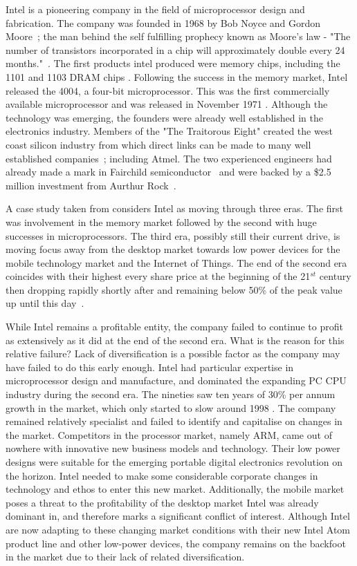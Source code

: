 {}

Intel is a pioneering company in the field of microprocessor design and fabrication.
The company was founded in 1968 by Bob Noyce and Gordon Moore~\cite{IntelHistory}; the man behind the self fulfilling prophecy known as Moore's law - "The number of transistors incorporated in a chip will approximately double every 24 months."~\cite{IntelMoore}.
The first products intel produced were memory chips, including the 1101 and 1103 DRAM chips \cite{IntelStartup}.
Following the success in the memory market, Intel released the 4004, a four-bit microprocessor.
This was the first commercially available microprocessor and was released in November 1971 \cite{IntelStartup}.
Although the technology was emerging, the founders were already well established in the electronics industry.
Members of the "The Traitorous Eight" created the west coast silicon industry from which direct links can be made to many well established companies~\cite{Eight}; including Atmel.
The two experienced engineers had already made a mark in Fairchild semiconductor~\cite{Fairchild} and were backed by a \$2.5 million investment from Aurthur Rock~\cite{IntelStartup}.

A case study taken from \cite{johnson2008exploring} considers Intel as moving through three eras.
The first was involvement in the memory market followed by the second with huge successes in microprocessors.
The third era, possibly still their current drive, is moving focus away from the desktop market towards low power devices for the mobile technology market and the Internet of Things.
The end of the second era coincides with their highest every share price at the beginning of the 21$^{st}$ century then dropping rapidly shortly after and remaining below 50\% of the peak value up until this day~\cite{IntelStock}.

While Intel remains a profitable entity, the company failed to continue to profit as extensively as it did at the end of the second era. 
What is the reason for this relative failure?
Lack of diversification is a possible factor as the company may have failed to do this early enough.
Intel had particular expertise in microprocessor design and manufacture, and dominated the expanding PC CPU industry during the second era. The nineties saw ten years of 30\% per annum growth in the market, which only started to slow around 1998 \cite{johnson2008exploring}.
The company remained relatively specialist and failed to identify and capitalise on changes in the market.
Competitors in the processor market, namely ARM, came out of nowhere with innovative new business models and technology.
Their low power designs were suitable for the emerging portable digital electronics revolution on the horizon.
Intel needed to make some considerable corporate changes in technology and ethos to enter this new market.
Additionally, the mobile market poses a threat to the profitability of the desktop market Intel was already dominant in, and therefore marks a significant conflict of interest.
Although Intel are now adapting to these changing market conditions with their new Intel Atom product line and other low-power devices, the company remains on the backfoot in the market due to their lack of related diversification.
